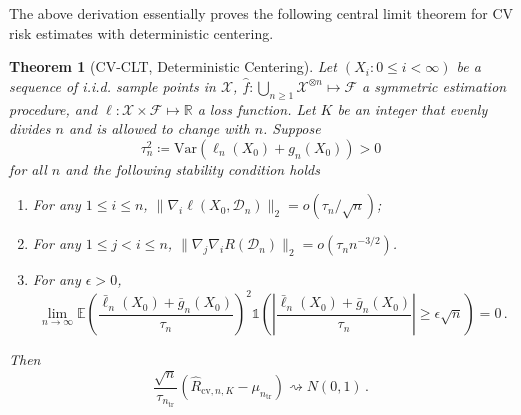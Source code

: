\documentclass[11pt]{article}
\theoremstyle{plain}
\newtheorem{theorem}{Theorem}[section]
\newcommand{\cv}{{\mathrm{cv}}}
\newcommand{\tr}{{\mathrm{tr}}}
\newcommand{\D}{{\mathcal{D}}}
\newcommand{\X}{{\mathcal{X}}}
\newcommand{\var}{\mathrm{Var}}
\begin{document}
The above derivation essentially proves the following central limit theorem for CV risk estimates with deterministic centering.
\begin{theorem}[CV-CLT, Deterministic Centering]
    \label{thm:4.2-cv-clt-det}
    Let $(X_i:0\le i<\infty)$ be a sequence of i.i.d. sample points in $\X$, $\hat f:\bigcup_{n\ge 1}\X^{\otimes n}\mapsto \mathcal F$ a symmetric estimation procedure, and $\ell:\X\times \mathcal F\mapsto \mathbb R$ a loss function. Let $K$ be an integer that evenly divides $n$ and is allowed to change with $n$.  Suppose 
    $$\tau_{n}^2\coloneqq \var(\ell_n(X_0)+g_{n}(X_0))>0$$
    for all $n$
    and the following stability condition holds
    \begin{enumerate}
    \item For any $1\le i\le n$, $\|\nabla_i \ell(X_0,\D_n)\|_2=o(\tau_n/\sqrt{n})$;
    \item For any $1\le j < i \le n$, $\|\nabla_j\nabla_i R(\D_n)\|_2=o(\tau_n n^{-3/2})$.
    \item For any $\epsilon>0$, \begin{equation}
        \label{eq:4.2-lindeberg-det}
        \lim_{n\rightarrow \infty}\mathbb E\left(\frac{\bar\ell_n(X_0)+\bar g_n(X_0)}{\tau_n}\right)^2\mathds{1}\left(\left|\frac{\bar\ell_n(X_0)+\bar g_n(X_0)}{\tau_n}\right|\ge \epsilon\sqrt{n}\right)=0\,.
   \end{equation}
    \end{enumerate}
    Then $$
    \frac{\sqrt{n}}{\tau_{n_\tr}}\left(\hat R_{\cv,n,K}-\mu_{n_\tr}\right)\rightsquigarrow N(0,1)\,.
    $$
\end{theorem}
\end{document}
